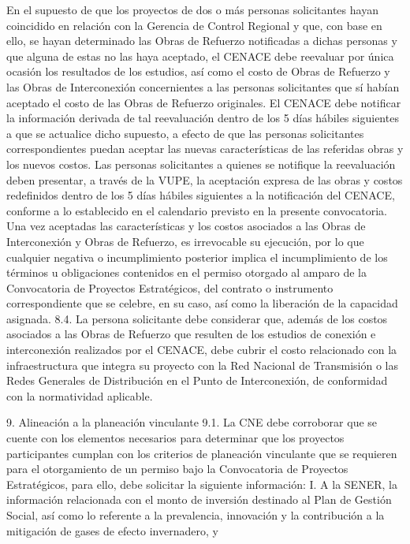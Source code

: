 En el supuesto de que los proyectos de dos o más personas solicitantes hayan coincidido en relación con la Gerencia de Control Regional y que, con base en ello, se hayan determinado las Obras de Refuerzo notificadas a dichas personas y que alguna de estas no las haya aceptado, el CENACE debe reevaluar por única ocasión los resultados de los estudios, así como el costo de Obras de Refuerzo y las Obras de Interconexión concernientes a las personas solicitantes que sí habían aceptado el costo de las Obras de Refuerzo originales. El CENACE debe notificar la información derivada de tal reevaluación dentro de los 5 días hábiles siguientes a que se actualice dicho supuesto, a efecto de que las personas solicitantes correspondientes puedan aceptar las nuevas características de las referidas obras y los nuevos costos. Las personas solicitantes a quienes se notifique la reevaluación deben presentar, a través de la VUPE, la aceptación expresa de las obras y costos redefinidos dentro de los 5 días hábiles siguientes a la notificación del CENACE, conforme a lo establecido en el calendario previsto en la presente convocatoria.
Una vez aceptadas las características y los costos asociados a las Obras de Interconexión y Obras de Refuerzo, es irrevocable su ejecución, por lo que cualquier negativa o incumplimiento posterior implica el incumplimiento de los términos u obligaciones contenidos en el permiso otorgado al amparo de la Convocatoria de Proyectos Estratégicos, del contrato o instrumento correspondiente que se celebre, en su caso, así como la liberación de la capacidad asignada.
8.4. La persona solicitante debe considerar que, además de los costos asociados a las Obras de Refuerzo que resulten de los estudios de conexión e interconexión realizados por el CENACE, debe cubrir el costo relacionado con la infraestructura que integra su proyecto con la Red Nacional de Transmisión o las Redes Generales de Distribución en el Punto de Interconexión, de conformidad con la normatividad aplicable.\par
9. Alineación a la planeación vinculante
9.1. La CNE debe corroborar que se cuente con los elementos necesarios para determinar que los proyectos participantes cumplan con los criterios de planeación vinculante que se requieren para el otorgamiento de un permiso bajo la Convocatoria de Proyectos Estratégicos, para ello, debe solicitar la siguiente información:
I. A la SENER, la información relacionada con el monto de inversión destinado al Plan de Gestión Social, así como lo referente a la prevalencia, innovación y la contribución a la mitigación de gases de efecto invernadero, y
